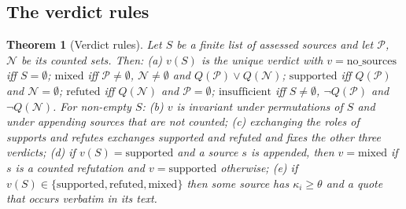 \documentclass[11pt,a4paper]{article}
\newtheorem{theorem}{Theorem}
\begin{document}
\subsection{The verdict rules}

\begin{theorem}[Verdict rules]
Let $S$ be a finite list of assessed sources and let $\mathcal{P}$, $\mathcal{N}$ be its counted sets. Then: (a) $v(S)$ is the unique verdict with $v=\text{no\_sources}$ iff $S=\emptyset$; $\text{mixed}$ iff $\mathcal{P}\ne\emptyset$, $\mathcal{N}\ne\emptyset$ and $Q(\mathcal{P})\lor Q(\mathcal{N})$; $\text{supported}$ iff $Q(\mathcal{P})$ and $\mathcal{N}=\emptyset$; $\text{refuted}$ iff $Q(\mathcal{N})$ and $\mathcal{P}=\emptyset$; $\text{insufficient}$ iff $S\ne\emptyset$, $\neg Q(\mathcal{P})$ and $\neg Q(\mathcal{N})$. For non-empty $S$: (b) $v$ is invariant under permutations of $S$ and under appending sources that are not counted; (c) exchanging the roles of supports and refutes exchanges supported and refuted and fixes the other three verdicts; (d) if $v(S)=\text{supported}$ and a source $s$ is appended, then $v=\text{mixed}$ if $s$ is a counted refutation and $v=\text{supported}$ otherwise; (e) if $v(S) \in \{\text{supported},\text{refuted},\text{mixed}\}$ then some source has $\kappa_i \ge \theta$ and a quote that occurs verbatim in its text.
\end{theorem}
\end{document}
